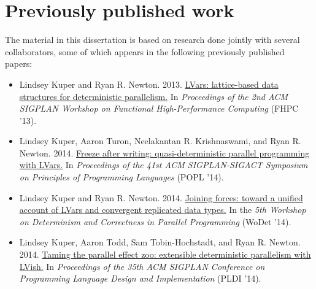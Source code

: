 \section{Previously published work}

\ifdefined\DISSERTATION
The material in this dissertation is based on research done jointly
with several collaborators, some of which appears in the following
previously published papers:


\begin{itemize}
\item Lindsey Kuper and Ryan
  R. Newton. 2013. \href{http://doi.acm.org/10.1145/2502323.2502326}{LVars:
    lattice-based data structures for deterministic parallelism.} In
  \emph{Proceedings of the 2nd ACM SIGPLAN Workshop on Functional
    High-Performance Computing} (FHPC '13).

\item Lindsey Kuper, Aaron Turon, Neelakantan R. Krishnaswami, and
  Ryan
  R. Newton. 2014. \href{http://doi.acm.org/10.1145/2535838.2535842
  }{Freeze after writing: quasi-deterministic parallel programming
    with LVars.} In \emph{Proceedings of the 41st ACM SIGPLAN-SIGACT
    Symposium on Principles of Programming Languages} (POPL '14).

\item Lindsey Kuper and Ryan
  R. Newton. 2014. \href{http://wodet.cs.washington.edu/wp-content/uploads/2014/02/wodet2014-final1.pdf}{Joining
    forces: toward a unified account of LVars and convergent
    replicated data types.} In the \emph{5th Workshop on Determinism
    and Correctness in Parallel Programming} (WoDet '14).

\item Lindsey Kuper, Aaron Todd, Sam Tobin-Hochstadt, and Ryan
  R. Newton. 2014. \href{http://doi.acm.org/10.1145/2594291.2594312
  }{Taming the parallel effect zoo: extensible deterministic
    parallelism with LVish.} In \emph{Proceedings of the 35th ACM
    SIGPLAN Conference on Programming Language Design and
    Implementation} (PLDI '14).
\end{itemize}


